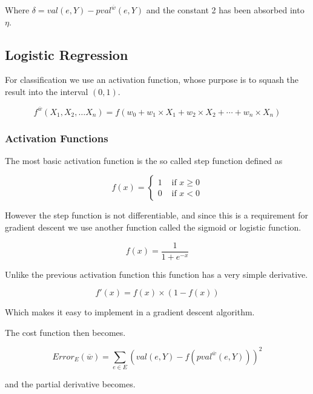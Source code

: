 Where $\delta = val(e,Y) - pval^{\overline{w}}(e,Y)$ and the constant 2 has been absorbed into $\eta$.

\begin{flushright}
\cite[p. 305]{AI2010}
\end{flushright}

\subsection{Logistic Regression}\label{sec:logistic}

For classification we use an activation function, whose purpose is to squash the result into the interval $(0,1)$.

\[ f^{\overline{w}}(X_1, X_2, \dots X_n) = f(w_0 + w_1 \times X_1 + w_2 \times X_2 + \cdots + w_n \times X_n) \]

\subsubsection{Activation Functions}

The most basic activation function is the so called step function defined as 

\[ f(x) = \begin{cases}

	1 &\text{ if } x \geq 0 \\
	0 &\text{ if } x < 0 
\end{cases}\]

However the step function is not differentiable, and since this is a requirement for gradient descent we use another
function called the sigmoid or logistic function.

\[ f(x) = \frac{1}{1+e^{-x}} \]

Unlike the previous activation function this function has a very simple derivative.

\[ f'(x) = f(x) \times (1-f(x)) \]

Which makes it easy to implement in a gradient descent algorithm.

The cost function then becomes.

\[ Error_E(\overline{w}) = \sum_{e \in E} \left(val(e,Y)-f\left(pval^{\overline{w}}(e,Y)\right)\right)^2 \]

and the partial derivative becomes.

